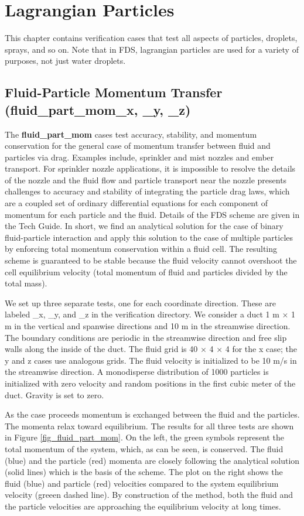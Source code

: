 \documentclass[11pt]{book}
\begin{document}
\chapter{Lagrangian Particles}

This chapter contains verification cases that test all aspects of particles, droplets, sprays, and so on. Note that in FDS, lagrangian particles are used for a variety of purposes, not just water droplets.

\section{Fluid-Particle Momentum Transfer (fluid\_part\_mom\_x, \_y, \_z)}

The {\bf fluid\_part\_mom} cases test accuracy, stability, and momentum conservation for the general case of momentum transfer between fluid and particles via drag.  Examples include, sprinkler and mist nozzles and ember transport.  For sprinkler nozzle applications, it is impossible to resolve the details of the nozzle and the fluid flow and particle transport near the nozzle presents challenges to accuracy and stability of integrating the particle drag laws, which are a coupled set of ordinary differential equations for each component of momentum for each particle and the fluid.  Details of the FDS scheme are given in the Tech Guide.  In short, we find an analytical solution for the case of binary fluid-particle interaction and apply this solution to the case of multiple particles by enforcing total momentum conservation within a fluid cell.  The resulting scheme is guaranteed to be stable because the fluid velocity cannot overshoot the cell equilibrium velocity (total momentum of fluid and particles divided by the total mass).

We set up three separate tests, one for each coordinate direction.  These are labeled \_x, \_y, and \_z in the verification directory.  We consider a duct 1 m $\times$ 1 m in the vertical and spanwise directions and 10 m in the streamwise direction.  The boundary conditions are periodic in the streamwise direction and free slip walls along the inside of the duct. The fluid grid is 40 $\times$ 4 $\times$ 4 for the x case; the y and z cases use analogous grids.  The fluid velocity is initialized to be 10 m/s in the streamwise direction.  A monodisperse distribution of 1000 particles is initialized with zero velocity and random positions in the first cubic meter of the duct.  Gravity is set to zero.

As the case proceeds momentum is exchanged between the fluid and the particles.  The momenta relax toward equilibrium.  The results for all three tests are shown in Figure \ref{fig_fluid_part_mom}.  On the left, the green symbols represent the total momentum of the system, which, as can be seen, is conserved.  The fluid (blue) and the particle (red) momenta are closely following the analytical solution (solid lines) which is the basis of the scheme.  The plot on the right shows the fluid (blue) and particle (red) velocities compared to the system equilibrium velocity (greeen dashed line).  By construction of the method, both the fluid and the particle velocities are approaching the equilibrium velocity at long times.
\end{document}
